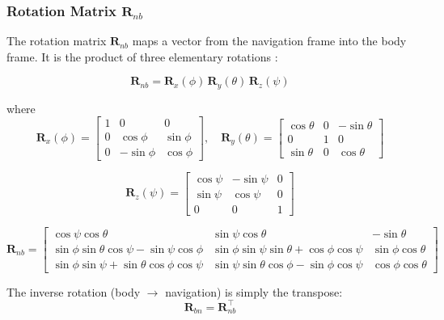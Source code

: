 \documentclass[12pt,a4paper]{article}
\begin{document}
\subsubsection{Rotation Matrix \texorpdfstring{$\bm{R}_{nb}$}{R\_nb}}

The rotation matrix $\bm{R}_{nb}$ maps a vector from the navigation frame
into the body frame. It is the product of three elementary rotations
\citep{groves2013principles}:

\begin{equation}
  \bm{R}_{nb} = \bm{R}_x(\phi)\,\bm{R}_y(\theta)\,\bm{R}_z(\psi)
  \label{eq:Rnb}
\end{equation}

where
\begin{equation}
  \bm{R}_x(\phi) =
  \begin{bmatrix}
    1 & 0 & 0 \\
    0 & \cos\phi & \sin\phi \\
    0 & -\sin\phi &  \cos\phi
  \end{bmatrix}, \quad
  \bm{R}_y(\theta) =
  \begin{bmatrix}
    \cos\theta & 0 & -\sin\theta \\
    0 & 1 & 0 \\
    \sin\theta & 0 & \cos\theta
  \end{bmatrix}
\end{equation}

\begin{equation}
  \bm{R}_z(\psi) =
  \begin{bmatrix}
    \cos\psi & -\sin\psi & 0 \\
    \sin\psi &  \cos\psi & 0 \\
    0 & 0 & 1
  \end{bmatrix}
\end{equation}

\begin{equation}
\mathbf{R}_{nb} =
\begin{bmatrix}
\cos\psi\cos\theta & \sin\psi\cos\theta & -\sin\theta \\
\sin\phi\sin\theta\cos\psi - \sin\psi\cos\phi &
\sin\phi\sin\psi\sin\theta + \cos\phi\cos\psi &
\sin\phi\cos\theta \\
\sin\phi\sin\psi + \sin\theta\cos\phi\cos\psi &
\sin\psi\sin\theta\cos\phi - \sin\phi\cos\psi &
\cos\phi\cos\theta
\end{bmatrix}
\label{eq:Rnb-expanded}
\end{equation}


The inverse rotation (body $\to$ navigation) is simply the transpose:
\begin{equation}
  \bm{R}_{bn} = \bm{R}_{nb}^{\top}
\end{equation}
\end{document}
